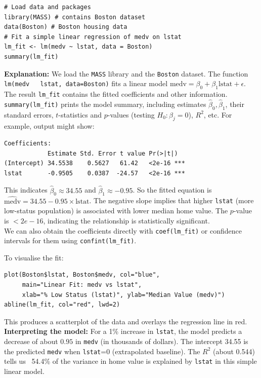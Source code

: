 \documentclass[11pt]{article}
\begin{document}
\begin{lstlisting}
# Load data and packages
library(MASS) # contains Boston dataset
data(Boston) # Boston housing data
# Fit a simple linear regression of medv on lstat
lm_fit <- lm(medv ~ lstat, data = Boston)
summary(lm_fit)
\end{lstlisting}

\noindent \textbf{Explanation:} We load the \texttt{MASS} library and the \texttt{Boston} dataset. The function \texttt{lm(medv ~ lstat, data=Boston)} fits a linear model $\text{medv} = \beta_0 + \beta_1 \text{lstat} + \epsilon$. The result \texttt{lm\_fit} contains the fitted coefficients and other information. \texttt{summary(lm\_fit)} prints the model summary, including estimates $\hat\beta_0, \hat\beta_1$, their standard errors, $t$-statistics and $p$-values (testing $H_0: \beta_j=0$), $R^2$, etc. For example, output might show:

\begin{verbatim}
Coefficients:
            Estimate Std. Error t value Pr(>|t|)    
(Intercept) 34.5538    0.5627   61.42   <2e-16 ***
lstat       -0.9505    0.0387  -24.57   <2e-16 ***
\end{verbatim}

This indicates $\hat\beta_0 \approx 34.55$ and $\hat\beta_1 \approx -0.95$. So the fitted equation is $\widehat{\text{medv}} = 34.55 - 0.95 \times \text{lstat}$. The negative slope implies that higher \texttt{lstat} (more low-status population) is associated with lower median home value. The $p$-value is $<2e-16$, indicating the relationship is statistically significant. \\

\noindent We can also obtain the coefficients directly with \texttt{coef(lm\_fit)} or confidence intervals for them using \texttt{confint(lm\_fit)}.

To visualise the fit:
\begin{lstlisting}
plot(Boston$lstat, Boston$medv, col="blue",
     main="Linear Fit: medv vs lstat", 
     xlab="% Low Status (lstat)", ylab="Median Value (medv)")
abline(lm_fit, col="red", lwd=2)
\end{lstlisting}

\noindnt This produces a scatterplot of the data and overlays the regression line in red. \\

\noindent \textbf{Interpreting the model:} For a 1\% increase in \texttt{lstat}, the model predicts a decrease of about $0.95$ in \texttt{medv} (in thousands of dollars). The intercept 34.55 is the predicted \texttt{medv} when \texttt{lstat}=0 (extrapolated baseline). The $R^2$ (about 0.544) tells us ~54.4\% of the variance in home value is explained by \texttt{lstat} in this simple linear model.
\end{document}
